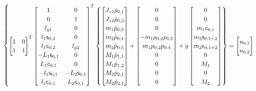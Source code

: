 \begin{itemize}
\begin{equation}
\begin{cases}
	\begin{bmatrix}
	1 & 0 \\
	1 & 1 \\
	\end{bmatrix}^T
	\begin{bmatrix}
	 1 & 0 \\
	 0 & 1 \\
	 l_{g1} & 0 \\
	 l_1 \mathsf{s}_{0,2} & 0 \\
	 l_1 \mathsf{c}_{0,2} & l_{g2} \\
	 -L_1 \mathsf{s}_{0,1} & 0 \\
	 L_1 \mathsf{c}_{0,1} & 0 \\
	 -l_1 \mathsf{s}_{0,1} & -L_2 \mathsf{s}_{0,1} \\
	 l_1 \mathsf{c}_{0,1} & L_2 \mathsf{c}_{0,1} \\
	\end{bmatrix}^T
	\begin{Bmatrix}
		\begin{bmatrix}
		J_{z1} \dot{p}_{0,1} \\
		J_{z2} \dot{p}_{0,2} \\
		m_1 \dot{p}_{0,3} \\
		m_2 \dot{p}_{0,4} \\
		m_2 \dot{p}_{0,5} \\
		M_1 \dot{p}_{1,1} \\
		M_1 \dot{p}_{1,2} \\
		M_2 \dot{p}_{2,1} \\
		M_2 \dot{p}_{2,1} \\
		\end{bmatrix}
		+
		\begin{bmatrix}
		0 \\
		0 \\
		0 \\
		- m_1 p_{0,2} p_{0,5} \\
		  m_1 p_{0,2} p_{0,4} \\
		0 \\
		0 \\
		0 \\
		0 \\
		\end{bmatrix}
		+
		g \begin{bmatrix}
		0 \\
		0 \\
		m_1 \mathsf{c}_{0,1} \\
		m_2 \mathsf{s}_{0,1+2} \\
		m_2 \mathsf{c}_{0,1+2} \\
		0 \\
		M_1 \\
		0 \\
		M_2 \\
		\end{bmatrix}
	\end{Bmatrix}
	=
	\begin{bmatrix}
	u_{0,1} \\
	u_{0,2}
	\end{bmatrix} \\


\end{cases}
\end{equation}
\end{itemize}
